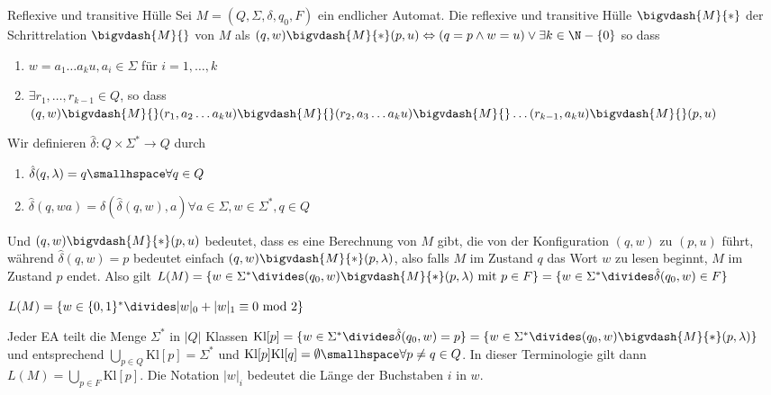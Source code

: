 \begin{definition}[]{Reflexive und transitive Hülle}
    Sei $M = (Q, \Sigma, \delta, q_0, F)$ ein endlicher Automat. Die reflexive und transitive Hülle $\bigvdash{M}{*}$ der Schrittrelation $\bigvdash{M}{}$ von $M$ als
    $(q, w) \bigvdash{M}{*} (p, u) \Leftrightarrow (q = p \land w = u) \lor \exists k \in \N - \{ 0 \}$ so dass
    \begin{enumerate}[label=\textit{(\roman*)}]
        \item $w = a_1\ldots a_ku, a_i \in \Sigma$ für $i = 1, \ldots, k$
        \item $\exists r_1, \ldots, r_{k - 1} \in Q$, so dass
              $(q, w) \bigvdash{M}{} (r_1, a_2 \ldots a_k u) \bigvdash{M}{} (r_2, a_3 \ldots a_k u) \bigvdash{M}{} \ldots (r_{k - 1}, a_k u) \bigvdash{M}{} (p, u)$
    \end{enumerate}
    Wir definieren $\hat{\delta}: Q \times \Sigma^* \rightarrow Q$ durch
    \rmvspace
    \rmvspace
    \begin{multicols}{2}
        \begin{enumerate}[label=\textit{(\roman*)}]
            \item $\hat{\delta}(q, \lambda) = q \smallhspace \forall q \in Q$
            \item $\hat{\delta}(q, wa) = \delta(\hat{\delta}(q, w), a) \forall a \in \Sigma, w \in \Sigma^*, q \in Q$
        \end{enumerate}
    \end{multicols}
\end{definition}
Und $(q, w) \bigvdash{M}{*} (p, u)$ bedeutet, dass es eine Berechnung von $M$ gibt, die von der Konfiguration $(q, w)$ zu $(p, u)$ führt,
während $\hat{\delta}(q, w) = p$ bedeutet einfach $(q, w) \bigvdash{M}{*} (p, \lambda)$, also falls $M$ im Zustand $q$ das Wort $w$ zu lesen beginnt, $M$ im Zustand $p$ endet.
Also gilt $L(M) = \{ w \in \Sigma^* \divides (q_0, w) \bigvdash{M}{*} (p, \lambda) \text{ mit } p \in F \} = \{ w \in \Sigma^* \divides \hat{\delta}(q_0, w) \in F \}$

\inlinelemma $L(M) = \{ w \in \{ 0, 1 \}^* \divides |w|_0 + |w|_1 \equiv 0 \text{ mod } 2 \}$

Jeder EA teilt die Menge $\Sigma^*$ in $|Q|$ Klassen
$\text{Kl}[p] = \{ w \in \Sigma^* \divides \hat{\delta}(q_0, w) = p \} = \{ w \in \Sigma^* \divides (q_0, w) \bigvdash{M}{*} (p, \lambda) \}$
und entsprechend $\bigcup_{p \in Q} \text{Kl}[p] = \Sigma^*$ und $\text{Kl}[p] \text{Kl}[q] = \emptyset \smallhspace \forall p \neq q \in Q$.
In dieser Terminologie gilt dann $L(M) = \bigcup_{p \in F} \text{Kl}[p]$.
Die Notation $|w|_i$ bedeutet die Länge der Buchstaben $i$ in $w$.

